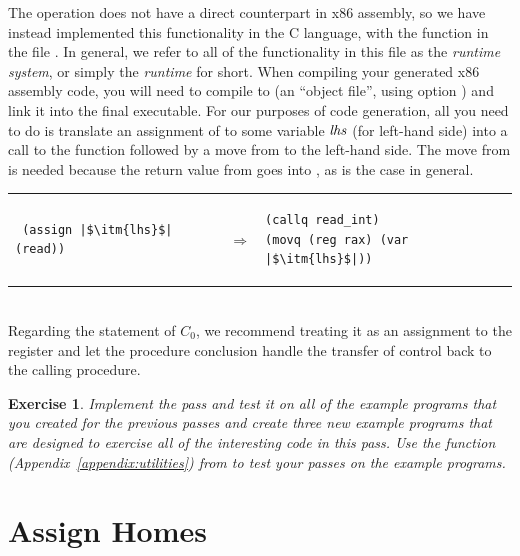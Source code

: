 \documentclass[11pt]{book}
\newtheorem{exercise}[theorem]{Exercise}
\begin{document}
The  operation does not have a direct counterpart in x86
assembly, so we have instead implemented this functionality in the C
language, with the function  in the file
. In general, we refer to all of the functionality in
this file as the \emph{runtime system}, or simply the \emph{runtime}
for short. When compiling your generated x86 assembly code, you
will need to compile  to  (an ``object
file'', using  option ) and link it into the final
executable. For our purposes of code generation, all you need to do is
translate an assignment of  to some variable $\mathit{lhs}$
(for left-hand side) into a call to the  function
followed by a move from  to the left-hand side.  The move
from  is needed because the return value from
 goes into , as is the case in general.  \\
\begin{tabular}{lll}
\begin{minipage}{0.4\textwidth}
\begin{lstlisting}
 (assign |$\itm{lhs}$| (read))
\end{lstlisting}
\end{minipage}
&
$\Rightarrow$
&
\begin{minipage}{0.4\textwidth}
\begin{lstlisting}
(callq read_int)
(movq (reg rax) (var |$\itm{lhs}$|))
\end{lstlisting}
\end{minipage}
\end{tabular} \\

Regarding the \RETURN{\Arg} statement of $C_0$, we recommend treating it
as an assignment to the  register and let the procedure
conclusion handle the transfer of control back to the calling
procedure.

\begin{exercise}
\normalfont
Implement the  pass and test it on all of the
example programs that you created for the previous passes and create
three new example programs that are designed to exercise all of the
interesting code in this pass. Use the  function
(Appendix~\ref{appendix:utilities}) from  to test
your passes on the example programs.
\end{exercise}

\section{Assign Homes}
\label{sec:assign-s0}
\end{document}
